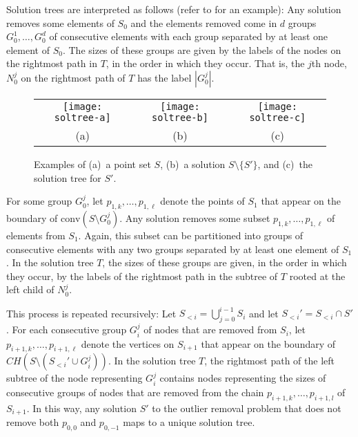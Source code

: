 \documentclass[lotsofwhite]{patmorin}
\newcommand{\ch}{\mathrm{conv}}
\begin{document}
Solution trees are interpreted as follows (refer to
 for an example): Any solution removes some
elements of $S_0$ and the elements removed come in $d$ groups
$G_0^1,\ldots,G_0^d$ of consecutive elements with each group separated
by at least one element of $S_0$.  The sizes of these groups are given
by the labels of the nodes on the rightmost path in $T$, in the order
in which they occur.  That is, the $j$th node, $N_0^j$ on the
rightmost path of $T$ has the label $|G_0^j|$. 

\begin{figure}
\begin{center}
\begin{tabular}{ccc}
\texttt{[image: soltree-a]} & 
\texttt{[image: soltree-b]} &
\texttt{[image: soltree-c]} \\
(a) & (b) & (c)
\end{tabular}
\end{center}
\caption{Examples of (a)~a point set $S$, (b)~a solution
$S\setminus\{S'\}$, and (c)~the solution tree for $S'$.}
\end{figure}

For some group $G_0^j$, let $p_{1,k}, \ldots, p_{1,\ell}$ denote the
points of $S_1$ that appear on the boundary of $\ch(S\setminus
G_0^j)$.  Any solution removes some subset $p_{1,k},\ldots,
p_{1,\ell}$ of elements from $S_1$.  Again, this subset can be
partitioned into groups of consecutive elements with any two groups
separated by at least one element of $S_1$.  In the solution tree $T$,
the sizes of these groups are given, in the order in which they occur,
by the labels of the rightmost path in the subtree of $T$ rooted at
the left child of $N_0^j$.

This process is repeated recursively: Let
$S_{<i}=\bigcup_{j=0}^{i-1}S_i$ and let $S_{<i}'=S_{<i}\cap S'$.  For
each consecutive group $G_i^j$ of nodes that are removed from $S_i$,
let $p_{i+1,k}, \ldots, p_{i+1,\ell}$ denote the vertices on $S_{i+1}$
that appear on the boundary of $CH(S \setminus (S_{<i}'\cup G_i^j))$.
In the solution tree $T$, the rightmost path of the left subtree of
the node representing $G_i^j$ contains nodes representing the sizes of
consecutive groups of nodes that are removed from the chain
$p_{i+1,k}, \ldots, p_{i+1,l}$ of $S_{i+1}$.  In this way, any
solution $S'$ to the outlier removal problem that does not remove both
$p_{0,0}$ and $p_{0,-1}$ maps to a unique solution tree.

\end{document}
